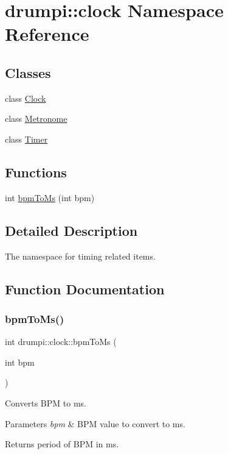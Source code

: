 \hypertarget{namespacedrumpi_1_1clock}{}\section{drumpi\+:\+:clock Namespace Reference}
\label{namespacedrumpi_1_1clock}
\subsection*{Classes}
\begin{DoxyCompactItemize}
\item 
class \hyperlink{classdrumpi_1_1clock_1_1Clock}{Clock}
\item 
class \hyperlink{classdrumpi_1_1clock_1_1Metronome}{Metronome}
\item 
class \hyperlink{classdrumpi_1_1clock_1_1Timer}{Timer}
\end{DoxyCompactItemize}
\subsection*{Functions}
\begin{DoxyCompactItemize}
\item 
int \hyperlink{namespacedrumpi_1_1clock_a69d2d1a2c8c6468db85767dd082f2ee0}{bpm\+To\+Ms} (int bpm)
\end{DoxyCompactItemize}


\subsection{Detailed Description}
The namespace for timing related items. 

\subsection{Function Documentation}
\mbox{\label{namespacedrumpi_1_1clock_a69d2d1a2c8c6468db85767dd082f2ee0}} 
\subsubsection{\texorpdfstring{bpm\+To\+Ms()}{bpmToMs()}}
{\footnotesize\ttfamily int drumpi\+::clock\+::bpm\+To\+Ms (\begin{DoxyParamCaption}\item[{int}]{bpm }\end{DoxyParamCaption})\hspace{0.3cm}{\ttfamily [inline]}}

Converts B\+PM to ms. 
\begin{DoxyParams}{Parameters}
{\em bpm} & B\+PM value to convert to ms. \\
\hline
\end{DoxyParams}
\begin{DoxyReturn}{Returns}
period of B\+PM in ms. 
\end{DoxyReturn}
